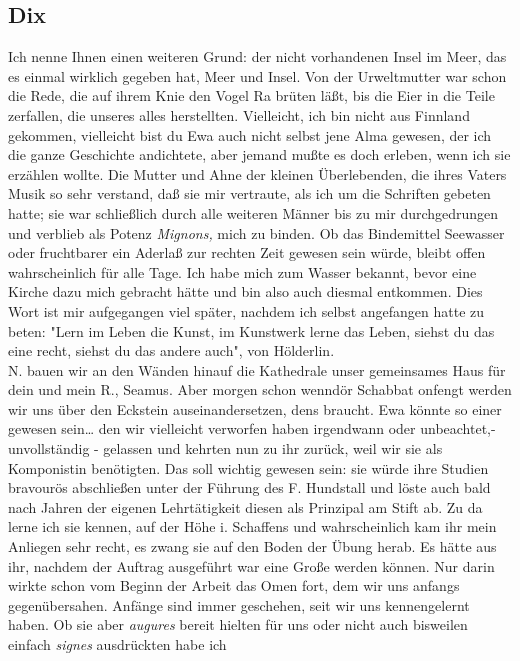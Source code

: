 \documentclass[
]{article}
\author{}
\date{\vspace{-2.5em}}
\begin{document}
\subsection{Dix}\label{dix}

Ich nenne Ihnen einen weiteren Grund: der nicht vorhandenen Insel im
Meer, das es einmal wirklich gegeben hat, Meer und Insel. Von der
Urweltmutter war schon die Rede, die auf ihrem Knie den Vogel Ra brüten
läßt, bis die Eier in die Teile zerfallen, die unseres alles
herstellten. Vielleicht, ich bin nicht aus Finnland gekommen, vielleicht
bist du Ewa auch nicht selbst jene Alma gewesen, der ich die ganze
Geschichte andichtete, aber jemand mußte es doch erleben, wenn ich sie
erzählen wollte. Die Mutter und Ahne der kleinen Überlebenden, die ihres
Vaters Musik so sehr verstand, daß sie mir vertraute, als ich um die
Schriften gebeten hatte; sie war schließlich durch alle weiteren Männer
bis zu mir durchgedrungen und verblieb als Potenz \emph{Mignons,} mich
zu binden. Ob das Bindemittel Seewasser oder fruchtbarer ein Aderlaß zur
rechten Zeit gewesen sein würde, bleibt offen wahrscheinlich für alle
Tage. Ich habe mich zum Wasser bekannt, bevor eine Kirche dazu mich
gebracht hätte und bin also auch diesmal entkommen. Dies Wort ist mir
aufgegangen viel später, nachdem ich selbst angefangen hatte zu beten:
"Lern im Leben die Kunst, im Kunstwerk lerne das Leben, siehst du das
eine recht, siehst du das andere auch", von Hölderlin.\\
N. bauen wir an den Wänden hinauf die Kathedrale unser gemeinsames Haus
für dein und mein R., Seamus. Aber morgen schon wenndör Schabbat onfengt
werden wir uns über den Eckstein auseinandersetzen, dens braucht. Ewa
könnte so einer gewesen sein\ldots{} den wir vielleicht verworfen haben
irgendwann oder unbeachtet,- unvollständig - gelassen und kehrten nun zu
ihr zurück, weil wir sie als Komponistin benötigten. Das soll wichtig
gewesen sein: sie würde ihre Studien bravourös abschließen unter der
Führung des F. Hundstall und löste auch bald nach Jahren der eigenen
Lehrtätigkeit diesen als Prinzipal am Stift ab. Zu da lerne ich sie
kennen, auf der Höhe i. Schaffens und wahrscheinlich kam ihr mein
Anliegen sehr recht, es zwang sie auf den Boden der Übung herab. Es
hätte aus ihr, nachdem der Auftrag ausgeführt war eine Große werden
können. Nur darin wirkte schon vom Beginn der Arbeit das Omen fort, dem
wir uns anfangs gegenübersahen. Anfänge sind immer geschehen, seit wir
uns kennengelernt haben. Ob sie aber \emph{augures} bereit hielten für
uns oder nicht auch bisweilen einfach \emph{signes} ausdrückten habe ich
\end{document}
